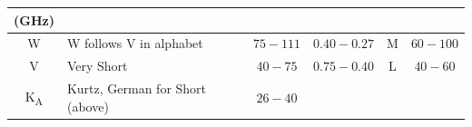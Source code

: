 \documentclass[
]{book}
\begin{document}
\begin{longtable}[]{@{}clcccc@{}}
\begin{minipage}[b]{0.06\columnwidth}
(GHz)\strut
\end{minipage}\tabularnewline
\midrule
\endhead
\begin{minipage}[t]{0.14\columnwidth}\centering
W\strut
\end{minipage} & \begin{minipage}[t]{0.25\columnwidth}\raggedright
W follows V in alphabet\strut
\end{minipage} & \begin{minipage}[t]{0.15\columnwidth}\centering
\(75-111\)\strut
\end{minipage} & \begin{minipage}[t]{0.09\columnwidth}\centering
\(0.40 - 0.27\)\strut
\end{minipage} & \begin{minipage}[t]{0.14\columnwidth}\centering
M\strut
\end{minipage} & \begin{minipage}[t]{0.06\columnwidth}\centering
\(60-100\)\strut
\end{minipage}\tabularnewline
\begin{minipage}[t]{0.14\columnwidth}\centering
V\strut
\end{minipage} & \begin{minipage}[t]{0.25\columnwidth}\raggedright
Very Short\strut
\end{minipage} & \begin{minipage}[t]{0.15\columnwidth}\centering
\(40-75\)\strut
\end{minipage} & \begin{minipage}[t]{0.09\columnwidth}\centering
\(0.75 - 0.40\)\strut
\end{minipage} & \begin{minipage}[t]{0.14\columnwidth}\centering
L\strut
\end{minipage} & \begin{minipage}[t]{0.06\columnwidth}\centering
\(40-60\)\strut
\end{minipage}\tabularnewline
\begin{minipage}[t]{0.14\columnwidth}\centering
K\textsubscript{A}\strut
\end{minipage} & \begin{minipage}[t]{0.25\columnwidth}\raggedright
Kurtz, German for Short (above)\strut
\end{minipage} & \begin{minipage}[t]{0.15\columnwidth}\centering
\(26-40\)\strut
\end{minipage} & \begin{minipage}[t]{0.09\columnwidth}\centering

\end{minipage}
\end{longtable}
\end{document}
